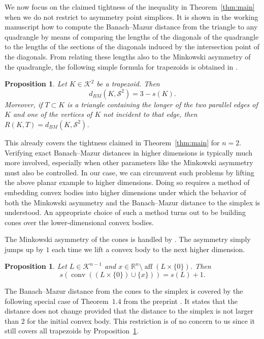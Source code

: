 \documentclass{amsart}
\newtheorem{proposition}[theorem]{Proposition}
\newcommand\R{\mathbb{R}}
\newcommand\CK{\mathcal{K}}
\DeclareMathOperator{\conv}{conv}
\DeclareMathOperator{\aff}{aff}
\newcommand{\simplex}[1]{\mathcal{S}^{#1}}
\newcommand{\embedding}[2]{#1 \times \{#2\}}
\newcommand{\coneembedding}[3]{\conv((\embedding{#1}{#2}) \cup \{#3\})}
\begin{document}
We now focus on the claimed tightness of the inequality in Theorem~\ref{thm:main} when we do not restrict to asymmetry point simplices.
It is shown in the working manuscript \cite{2026:Grundbacher}
how to compute the Banach--Mazur distance from the triangle to any quadrangle by means of comparing the lengths of the diagonals of the quadrangle to the lengths of the sections of the diagonals induced by the intersection point of the diagonals.
From relating these lengths also to the Minkowski asymmetry of the quadrangle, the following simple formula for trapezoids is obtained in \cite{2026:Grundbacher}.



\begin{proposition} \label{prop:trapezoid}
Let $K \in \CK^2$ be a trapezoid. Then
\[
    d_{BM}(K,\simplex{2})
    = 3 - s(K).
\]
Moreover, if $T \subset K$ is a triangle containing the longer of the two parallel edges of $K$ and one of the vertices of $K$ not incident to that edge,
then $R(K,T) = d_{BM}(K,\simplex{2})$.
\end{proposition}



This already covers the tightness claimed in Theorem~\ref{thm:main} for $n = 2$.
Verifying exact Banach--Mazur distances in higher dimensions is typically much more involved, especially when other parameters like the Minkowski asymmetry must also be controlled.
In our case, we can circumvent such problems by lifting the above planar example to higher dimensions.
Doing so requires a method of embedding convex bodies into higher dimensions under which the behavior of both the Minkowski asymmetry and the Banach--Mazur distance to the simplex is understood.
An appropriate choice of such a method turns out to be building cones over the lower-dimensional convex bodies.

The Minkowski asymmetry of the cones is handled by \cite[Theorem~2]{2002:GuoKaijser}.
The asymmetry simply jumps up by $1$ each time we lift a convex body to the next higher dimension.



\begin{proposition} \label{prop:cone_asymmetry}
Let $L \in \CK^{n-1}$ and $x \in \R^n \setminus \aff(\embedding{L}{0})$.
Then
\[
    s(\coneembedding{L}{0}{x})
    = s(L) + 1.
\]
\end{proposition}



The Banach--Mazur distance from the cones to the simplex is covered by the following special case of Theorem~$1.4$ from the preprint \cite{2026:GrundbacherKobos}.
It states that the distance does not change provided that the distance to the simplex is not larger than $2$ for the initial convex body.
This restriction is of no concern to us since it still covers all trapezoids by Proposition~\ref{prop:trapezoid}.
\end{document}
